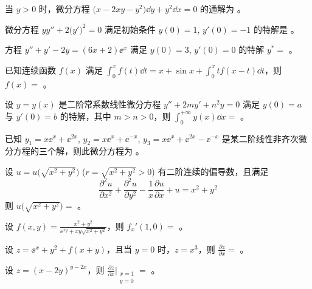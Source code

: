 \begin{ti}
	当 $y > 0$ 时，微分方程 $\bigl( x - 2xy - y^2 \bigr) \dd{y} + y^2 \dd{x} = 0$ 的通解为 \hua。
\end{ti}

\begin{ti}
	微分方程 $yy'' + 2\bigl( y' \bigr)^2 = 0$ 满足初始条件 $y(0) = 1$, $y'(0) = -1$ 的特解是 \hua。
\end{ti}

\begin{ti}
	方程 $y'' + y' - 2y = (6x + 2) \ee^x$ 满足 $y(0) = 3$, $y'(0) = 0$ 的特解 $y^\ast = $ \hua。
\end{ti}

\begin{ti}
	已知连续函数 $f(x)$ 满足 $\int_0^x f(t) \dd{t} = x + \sin x + \int_0^x t f(x-t) \dd{t}$，则 $f(x) = $ \hua。
\end{ti}

\begin{ti}
	设 $y = y(x)$ 是二阶常系数线性微分方程 $y'' + 2my' + n^2y = 0$ 满足 $y(0) = a$ 与 $y'(0) = b$ 的特解，其中 $m > n > 0$，则 $\int_0^{+\infty} y(x) \dd{x} = $ \hua。
\end{ti}

\begin{ti}
	已知 $y_1 = x\ee^x + \ee^{2x}$, $y_2 = x\ee^x + \ee^{-x}$, $y_3 = x\ee^x + \ee^{2x} - \ee^{-x}$ 是某二阶线性非齐次微分方程的三个解，则此微分方程为 \hua。
\end{ti}

\begin{ti}
	设 $u = u \bigl( \sqrt{x^2 + y^2} \bigr)$ ($r = \sqrt{x^2 + y^2} > 0$) 有二阶连续的偏导数，且满足
	\[
		\frac{\partial^2u}{\partial x^2} + \frac{\partial^2u}{\partial y^2} - \frac 1x \frac{\partial u}{\partial x} + u = x^2 + y^2
	\]
	则 $u \bigl( \sqrt{x^2 + y^2} \bigr) = $ \hua。
\end{ti}

\begin{ti}
	设 $f(x,y) = \frac{x^2 + y^2}{\ee^{xy} + xy \sqrt{x^2 + y^2}}$，则 $f_x'(1,0) = $ \hua。
\end{ti}

\begin{ti}
	设 $z = \ee^x + y^2 + f(x+y)$，且当 $y=0$ 时，$z = x^3$，则 $\frac{\partial z}{\partial x} = $ \hua。
\end{ti}

\begin{ti}
	设 $z = (x-2y)^{y-2x}$，则 $\frac{\partial z}{\partial x}\biggl|_{\substack{x=1\\y=0}} = $ \hua。
\end{ti}


